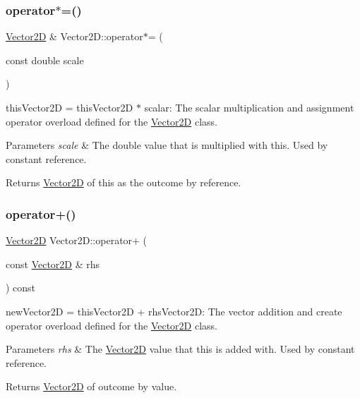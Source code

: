 \subsubsection{\texorpdfstring{operator$\ast$=()}{operator*=()}\hspace{0.1cm}{\footnotesize\ttfamily [2/2]}}
{\footnotesize\ttfamily \hyperlink{class_vector2_d}{Vector2D} \& Vector2\+D\+::operator$\ast$= (\begin{DoxyParamCaption}\item[{const double}]{scale }\end{DoxyParamCaption})}



this\+Vector2D = this\+Vector2D $\ast$ scalar\+: The scalar multiplication and assignment operator overload defined for the \hyperlink{class_vector2_d}{Vector2D} class. 


\begin{DoxyParams}{Parameters}
{\em scale} & The double value that is multiplied with this. Used by constant reference. \\
\hline
\end{DoxyParams}
\begin{DoxyReturn}{Returns}
\hyperlink{class_vector2_d}{Vector2D} of this as the outcome by reference. 
\end{DoxyReturn}
\mbox{\label{class_vector2_d_a142a352f6cb2406fee15d153a275439c}} 
\subsubsection{\texorpdfstring{operator+()}{operator+()}}
{\footnotesize\ttfamily \hyperlink{class_vector2_d}{Vector2D} Vector2\+D\+::operator+ (\begin{DoxyParamCaption}\item[{const \hyperlink{class_vector2_d}{Vector2D} \&}]{rhs }\end{DoxyParamCaption}) const}



new\+Vector2D = this\+Vector2D + rhs\+Vector2D\+: The vector addition and create operator overload defined for the \hyperlink{class_vector2_d}{Vector2D} class. 


\begin{DoxyParams}{Parameters}
{\em rhs} & The \hyperlink{class_vector2_d}{Vector2D} value that this is added with. Used by constant reference. \\
\hline
\end{DoxyParams}
\begin{DoxyReturn}{Returns}
\hyperlink{class_vector2_d}{Vector2D} of outcome by value. 
\end{DoxyReturn}
\mbox{\label{class_vector2_d_affc6e2a6034a4c4249a3e8b17f633069}} 
